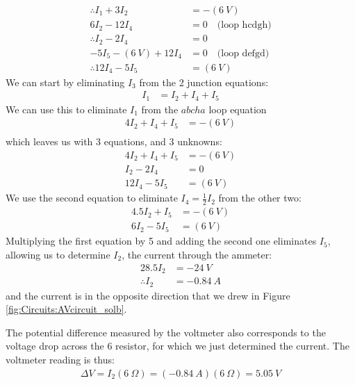 \begin{solution}
\begin{parts}
\begin{align*}
		\therefore I_1 +3I_2&=-(\SI{6}{V})\\
		6I_2-12I_4&=0\quad\text{(loop hcdgh)}\\
		\therefore I_2-2I_4&=0\\
		-5I_5-(\SI{6}{V})+12I_4&=0\quad\text{(loop defgd)}\\
		\therefore 12I_4-5I_5&=(\SI{6}{V})
		\end{align*}
		We can start by eliminating $I_3$ from the 2 junction equations:
		\begin{align*}
		I_1&=I_2+I_4+I_5
		\end{align*}
		We can use this to eliminate $I_1$ from the $abcha$ loop equation
		\begin{align*}
		4I_2+I_4+I_5 &=-(\SI{6}{V})\\
		\end{align*}
		which leaves us with 3 equations, and 3 unknowns:
		\begin{align}
		4I_2+I_4+I_5 &=-(\SI{6}{V}) \\
		I_2-2I_4&=0\\
		12I_4-5I_5&=(\SI{6}{V})
		\end{align}
		We use the second equation to eliminate $I_4=\frac{1}{2}I_2$ from the other two:
		\begin{align*}
		4.5I_2+I_5 &=-(\SI{6}{V}) \\
		6I_2-5I_5&=(\SI{6}{V})
		\end{align*}
		Multiplying the first equation by 5 and adding the second one eliminates $I_5$, allowing us to determine $I_2$, the current through the ammeter:
		\begin{align*}
		28.5I_2&=\SI{-24}{V}\\
		\therefore I_2&=\SI{-0.84}{A}
		\end{align*}
		and the current is in the opposite direction that we drew in Figure \ref{fig:Circuits:AVcircuit_solb}.
		
		The potential difference measured by the voltmeter also corresponds to the voltage drop across the \SI{6}{\Omega} resistor, for which we just determined the current. The voltmeter reading is thus:
		\begin{align*}
		\Delta V = I_2(\SI{6}{\Omega})=(\SI{-0.84}{A})(\SI{6}{\Omega})=\SI{5.05}{V}
		\end{align*}
	\end{parts}
\end{solution}